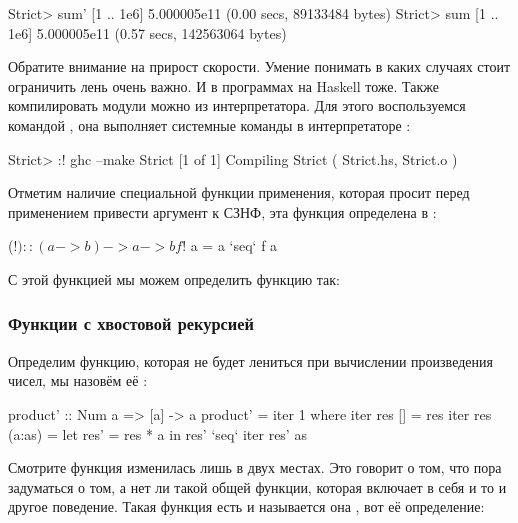 \begin{code}
Strict> sum' [1 .. 1e6]
5.000005e11
(0.00 secs, 89133484 bytes)
Strict> sum [1 .. 1e6]
5.000005e11
(0.57 secs, 142563064 bytes)
\end{code}

Обратите внимание на прирост скорости. Умение понимать
в каких случаях стоит ограничить лень очень важно. 
И в программах на Haskell тоже. 
Также компилировать модули можно из интерпретатора.
Для этого воспользуемся командой \In{:!}, она 
выполняет системные команды в интерпретаторе :

\begin{code}
Strict> :! ghc --make Strict
[1 of 1] Compiling Strict           ( Strict.hs, Strict.o )
\end{code}

Отметим наличие специальной функции применения, которая
просит перед применением привести аргумент к СЗНФ, эта 
функция определена в :

\begin{code}
($!) :: (a -> b) -> a -> b
 f $! a = a `seq` f a
\end{code}

С этой функцией мы можем определить функцию  так:



\subsubsection{Функции с хвостовой рекурсией}

Определим функцию, которая не будет лениться при
вычислении произведения чисел, мы назовём её :

\begin{code}
product' :: Num a => [a] -> a
product' = iter 1
    where iter res []        = res
          iter res (a:as)    = let res' = res * a
                               in  res' `seq` iter res' as 
\end{code}

Смотрите функция  изменилась лишь в двух местах. Это
говорит о том, что пора задуматься о том, а нет ли такой
общей функции, которая включает в себя и то и другое поведение.
Такая функция есть и называется она , вот её определение:

